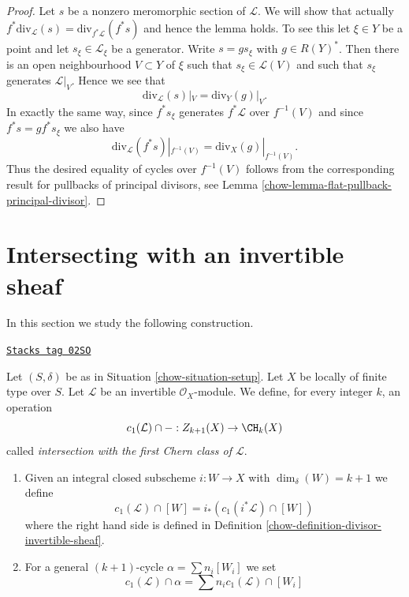 \begin{proof}

Let $s$ be a nonzero meromorphic section of $\mathcal{L}$.
We will show that actually
$f^*\text{div}_\mathcal{L}(s) = \text{div}_{f^*\mathcal{L}}(f^*s)$
and hence the lemma holds.
To see this let $\xi \in Y$ be a point and let $s_\xi \in \mathcal{L}_\xi$
be a generator. Write $s = gs_\xi$ with $g \in R(Y)^*$.
Then there is an open neighbourhood $V \subset Y$ of $\xi$
such that $s_\xi \in \mathcal{L}(V)$ and such that $s_\xi$ generates
$\mathcal{L}|_V$. Hence we see that
$$
\text{div}_\mathcal{L}(s)|_V = \text{div}_Y(g)|_V.
$$
In exactly the same way, since $f^*s_\xi$ generates $f^*\mathcal{L}$
over $f^{-1}(V)$ and since $f^*s = g f^*s_\xi$ we also
have
$$
\text{div}_\mathcal{L}(f^*s)|_{f^{-1}(V)}
=
\text{div}_X(g)|_{f^{-1}(V)}.
$$
Thus the desired equality of cycles over $f^{-1}(V)$ follows from the
corresponding result for pullbacks of principal divisors, see
Lemma \ref{chow-lemma-flat-pullback-principal-divisor}.
\end{proof}

\section{Intersecting with an invertible sheaf}
\label{chow-section-intersecting-with-divisors}
In this section we study the following construction.

\begin{definition}[Cap c1]
\label{chow-definition-cap-c1}
\href{https://stacks.math.columbia.edu/tag/02SO}{\texttt{Stacks tag 02SO}}

Let $(S, \delta)$ be as in Situation \ref{chow-situation-setup}.
Let $X$ be locally of finite type over $S$.
Let $\mathcal{L}$ be an invertible $\mathcal{O}_X$-module.
We define, for every integer $k$, an operation
$$
c_1(\mathcal{L}) \cap - :
Z_{k + 1}(X) \to \CH_k(X)
$$
called {\it intersection with the first Chern class of $\mathcal{L}$}.
\begin{enumerate}
\item Given an integral closed subscheme $i : W \to X$ with
$\dim_\delta(W) = k + 1$ we define
$$
c_1(\mathcal{L}) \cap [W] = i_*(c_1({i^*\mathcal{L}}) \cap [W])
$$
where the right hand side is defined in
Definition \ref{chow-definition-divisor-invertible-sheaf}.
\item For a general $(k + 1)$-cycle $\alpha = \sum n_i [W_i]$ we set
$$
c_1(\mathcal{L}) \cap \alpha = \sum n_i c_1(\mathcal{L}) \cap [W_i]
$$
\end{enumerate}
\end{definition}

